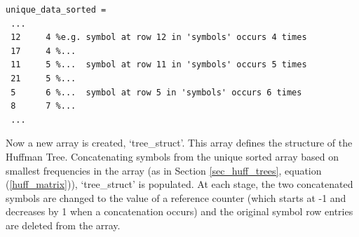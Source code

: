 \documentclass[12pt]{article}
\begin{document}
\begin{verbatim}
unique_data_sorted =
 ...
 12     4 %e.g. symbol at row 12 in 'symbols' occurs 4 times
 17     4 %...  
 11     5 %...  symbol at row 11 in 'symbols' occurs 5 times
 21     5 %...
 5      6 %...  symbol at row 5 in 'symbols' occurs 6 times
 8      7 %...
 ...
\end{verbatim}

Now a new array is created, `tree\_struct'. This array defines the structure of the Huffman Tree. Concatenating symbols from the unique sorted array based on smallest frequencies in the array (as in Section \ref{sec_huff_trees}, equation (\ref{huff_matrix})), `tree\_struct' is populated. At each stage, the two concatenated symbols are changed to the value of a reference counter (which starts at -1 and decreases by 1 when a concatenation occurs) and the original symbol row entries are deleted from the array.
\end{document}
